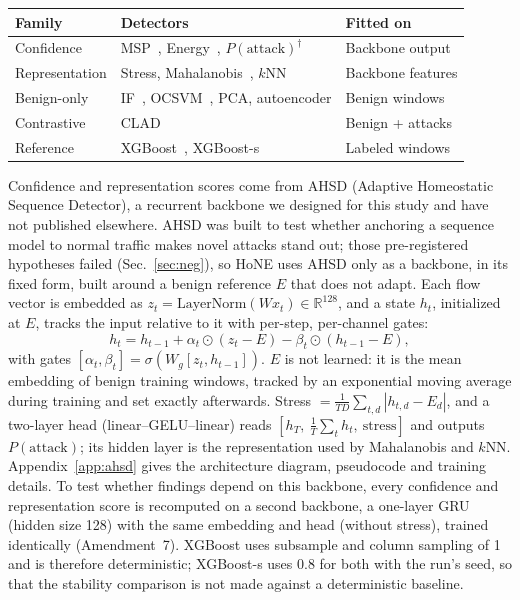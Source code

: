 \documentclass[conference]{IEEEtran}
\begin{document}
\makeatletter
\begin{center}
\scriptsize

\def\@captype{table}
\caption{Detector panel evaluated in HoNE.}
\label{tab:det}

\begin{tabular*}{0.97\columnwidth}{@{\extracolsep{\fill}}lll@{}}
\toprule
Family & Detectors & Fitted on\\
\midrule
Confidence & MSP~\cite{hendrycks2017}, Energy~\cite{liu2020energy}, $P(\text{attack})^\dagger$ & Backbone output\\
Representation & Stress, Mahalanobis~\cite{lee2018}, $k$NN~\cite{sun2022knn} & Backbone features\\
Benign-only & IF~\cite{liu2008}, OCSVM~\cite{scholkopf2001}, PCA, autoencoder & Benign windows\\
Contrastive & CLAD~\cite{wilkie2026} & Benign + attacks\\
Reference & XGBoost~\cite{chen2016}, XGBoost-s & Labeled windows\\
\bottomrule
\end{tabular*}
\end{center}
\makeatother

Confidence and representation scores come from AHSD (Adaptive Homeostatic Sequence Detector), a recurrent backbone we designed for this study and have not published elsewhere. AHSD was built to test whether anchoring a sequence model to normal traffic makes novel attacks stand out; those pre-registered hypotheses failed (Sec.~\ref{sec:neg}), so HoNE uses AHSD only as a backbone, in its fixed form, built around a benign reference $E$ that does not adapt. Each flow vector is embedded as $z_t=\mathrm{LayerNorm}(Wx_t)\in\mathbb{R}^{128}$, and a state $h_t$, initialized at $E$, tracks the input relative to it with per-step, per-channel gates:
\begin{equation}
h_t = h_{t-1} + \alpha_t\odot(z_t - E) - \beta_t\odot(h_{t-1}-E),
\end{equation}
with gates $[\alpha_t,\beta_t]=\sigma(W_g[z_t,h_{t-1}])$. $E$ is not learned: it is the mean embedding of benign training windows, tracked by an exponential moving average during training and set exactly afterwards. Stress $=\frac{1}{TD}\sum_{t,d}|h_{t,d}-E_d|$, and a two-layer head (linear--GELU--linear) reads $[h_T,\ \frac{1}{T}\sum_t h_t,\ \text{stress}]$ and outputs $P(\text{attack})$; its hidden layer is the representation used by Mahalanobis and $k$NN. Appendix~\ref{app:ahsd} gives the architecture diagram, pseudocode and training details. To test whether findings depend on this backbone, every confidence and representation score is recomputed on a second backbone, a one-layer GRU (hidden size 128) with the same embedding and head (without stress), trained identically (Amendment~7). XGBoost uses subsample and column sampling of 1 and is therefore deterministic; XGBoost-s uses 0.8 for both with the run's seed, so that the stability comparison is not made against a deterministic baseline.
\end{document}
